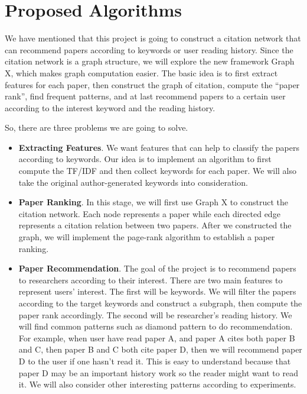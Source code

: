 \section{Proposed Algorithms}

We have mentioned that this project is going to construct a citation network that can recommend papers according to keywords or user reading history. Since the citation network is a graph structure, we will explore the new framework Graph X, which makes graph computation easier. The basic idea is to first extract features for each paper, then construct the graph of citation, compute the ``paper rank'', find frequent patterns, and at last recommend papers to a certain user according to the interest keyword and the reading history.

So, there are three problems we are going to solve.

\begin{itemize}
	\item \textbf{Extracting Features}. We want features that can help to classify the papers according to keywords. Our idea is to implement an algorithm to first compute the TF/IDF and then collect keywords for each paper. We will also take the original author-generated keywords into consideration.
	\item \textbf{Paper Ranking}. In this stage, we will first use Graph X to construct the citation network. Each node represents a paper while each directed edge represents a citation relation between two papers. After we constructed the graph, we will implement the page-rank algorithm to establish a paper ranking. 
	\item \textbf{Paper Recommendation}. The goal of the project is to recommend papers to researchers according to their interest. There are two main features to represent users' interest. The first will be keywords. We will filter the papers according to the target keywords and construct a subgraph, then compute the paper rank accordingly. The second will be researcher's reading history. We will find common patterns such as diamond pattern to do recommendation. For example, when user have read paper A, and paper A cites both paper B and C, then paper B and C both cite paper D, then we will recommend paper D to the user if one hasn't read it. This is easy to understand because that paper D may be an important history work so the reader might want to read it. We will also consider other interesting patterns according to experiments.
\end{itemize}